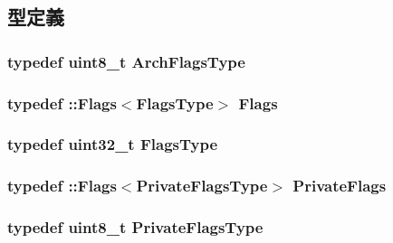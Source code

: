\subsection{型定義}
\hypertarget{classRequest_a50db53f1e2a3c758ce63d2a6046d8888}{
\subsubsection[{ArchFlagsType}]{\setlength{\rightskip}{0pt plus 5cm}typedef uint8\_\-t {\bf ArchFlagsType}}}
\label{classRequest_a50db53f1e2a3c758ce63d2a6046d8888}
\hypertarget{classRequest_ad6cda6b0b8d7ddfbf8e769082577b482}{
\subsubsection[{Flags}]{\setlength{\rightskip}{0pt plus 5cm}typedef ::{\bf Flags}$<${\bf FlagsType}$>$ {\bf Flags}}}
\label{classRequest_ad6cda6b0b8d7ddfbf8e769082577b482}
\hypertarget{classRequest_a2da503161d95c65aea559dbabcf570aa}{
\subsubsection[{FlagsType}]{\setlength{\rightskip}{0pt plus 5cm}typedef {\bf uint32\_\-t} {\bf FlagsType}}}
\label{classRequest_a2da503161d95c65aea559dbabcf570aa}
\hypertarget{classRequest_a1a6d0badb5909edf711053302528cd2a}{
\subsubsection[{PrivateFlags}]{\setlength{\rightskip}{0pt plus 5cm}typedef ::{\bf Flags}$<${\bf PrivateFlagsType}$>$ {\bf PrivateFlags}}}
\label{classRequest_a1a6d0badb5909edf711053302528cd2a}
\hypertarget{classRequest_ae45e5883b1d9912cc794fd219c392cc3}{
\subsubsection[{PrivateFlagsType}]{\setlength{\rightskip}{0pt plus 5cm}typedef uint8\_\-t {\bf PrivateFlagsType}}}
\label{classRequest_ae45e5883b1d9912cc794fd219c392cc3}


